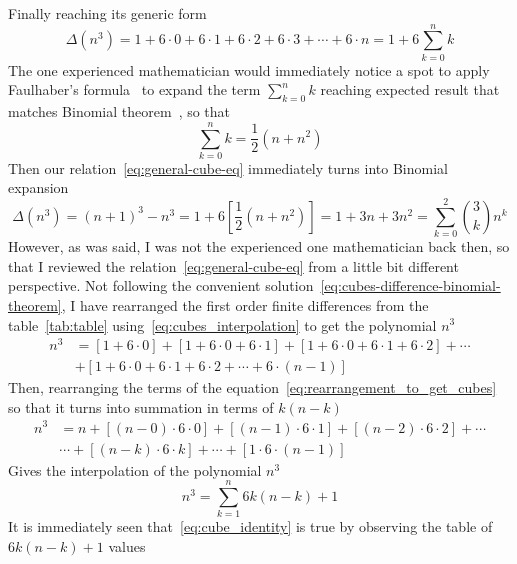 Finally reaching its generic form
\begin{equation}
    \Delta(n^3) = 1+6\cdot0+6\cdot1+6\cdot2+6\cdot3+\cdots+6\cdot n = 1 + 6 \sum_{k=0}^{n} k\label{eq:general-cube-eq}
\end{equation}
The one experienced mathematician would immediately notice a spot to apply Faulhaber's formula~\cite{beardon1996sums}
to expand the term $\sum_{k=0}^{n} k$ reaching expected result that matches Binomial theorem~\cite{abramowitz1988handbook},
so that
\begin{equation*}
    \sum_{k=0}^{n} k = \frac{1}{2}(n+n^2)
\end{equation*}
Then our relation~\eqref{eq:general-cube-eq} immediately turns into Binomial expansion
\begin{equation}
    \Delta(n^3) = (n+1)^3 - n^3 = 1 + 6 \left[ \frac{1}{2}(n+n^2) \right] = 1 + 3 n + 3 n^2 = \sum_{k=0}^{2} \binom{3}{k} n^k
    \label{eq:cubes-difference-binomial-theorem}
\end{equation}
However, as was said, I was not the experienced one mathematician back then,
so that I reviewed the relation~\eqref{eq:general-cube-eq} from a little bit different perspective.
Not following the convenient solution~\eqref{eq:cubes-difference-binomial-theorem},
I have rearranged the first order finite differences from the table~\eqref{tab:table} using~\eqref{eq:cubes_interpolation}
to get the polynomial $n^3$
\begin{align}
    \label{eq:rearrangement_to_get_cubes}
    n^3 &= [1+6\cdot0]+[1+6\cdot0+6\cdot1]+[1+6\cdot0+6\cdot1+6\cdot2]+\cdots \nonumber \\
    &+[1+6\cdot0+6\cdot1+6\cdot2+\cdots+6\cdot(n-1)]
\end{align}
Then, rearranging the terms of the equation~\eqref{eq:rearrangement_to_get_cubes} so that it turns into summation
in terms of $k (n-k)$
\begin{equation*}
    \begin{split}
        n^3 &= n + [(n-0) \cdot 6 \cdot 0] + [(n-1)\cdot6\cdot1] + [(n-2)\cdot6\cdot2] + \cdots \\
        &\cdots + [(n-k)\cdot 6 \cdot k] + \cdots + [1\cdot6\cdot(n-1)]
    \end{split}
\end{equation*}
Gives the interpolation of the polynomial $n^3$
\begin{equation}
    \label{eq:cube_identity}
    n^3 = \sum_{k=1}^{n} 6k(n-k) + 1
\end{equation}
It is immediately seen that~\eqref{eq:cube_identity} is true by observing the table of $6k(n-k) + 1$ values
